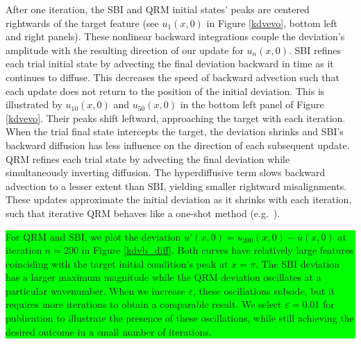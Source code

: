 \documentclass[%
 reprint,
 amsmath,amssymb,
 aps,
 pre,
]{revtex4-2}
\newcommand{\hly}[1]{\colorbox{lime}{\parbox{\columnwidth}{#1}}}
\begin{document}
After one iteration, the SBI and QRM initial states' peaks are centered rightwards of the target feature (see $u_1(x,0)$ in Figure \ref{kdvevo}, bottom left and right panels). 
These nonlinear backward integrations couple the deviation's amplitude with the resulting direction of our update for $u_n(x,0)$.
SBI refines each trial initial state by advecting the final deviation backward in time as it continues to diffuse. 
This decreases the speed of backward advection such that each update does not return to the position of the initial deviation.
This is illustrated by $u_{10}(x,0)$ and $u_{50}(x,0)$ in the bottom left panel of Figure \ref{kdvevo}.
Their peaks shift leftward, approaching the target with each iteration.
When the trial final state intercepts the target, the deviation shrinks and SBI's backward diffusion has less influence on the direction of each subsequent update.
QRM refines each trial state by advecting the final deviation while simultaneously inverting diffusion.
The hyperdiffusive term slows backward advection to a lesser extent than SBI, yielding smaller rightward misalignments. 
These updates approximate the initial deviation as it shrinks with each iteration, such that iterative QRM behaves like a one-shot method (e.g.~\cite{Nabi2022}).

\hspace{-0.45cm}\hly{For QRM and SBI, we plot the deviation $u'(x,0) = u_{200}(x,0) - \overline{u}(x,0)$ at iteration $n=200$ in Figure \ref{kdvb_diff}.
Both curves have relatively large features coinciding with the target initial condition's peak at $x=\pi$.
The SBI deviation has a larger maximum magnitude while the QRM deviation oscillates at a particular wavenumber.
When we increase $\varepsilon$, these oscillations subside, but it requires more iterations to obtain a comparable result.
We select $\varepsilon = 0.01$ for publication to illustrate the presence of these oscillations, while still achieving the desired outcome in a small number of iterations.
}
\end{document}
